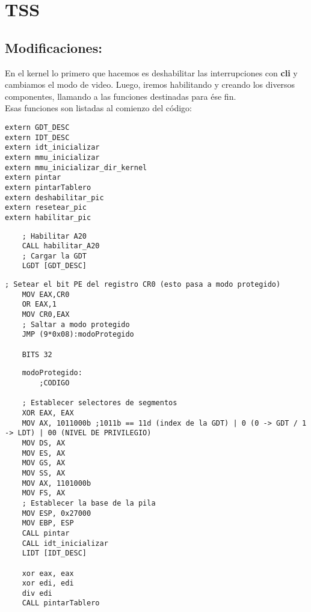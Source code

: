
\section{TSS}
\subsection{Modificaciones:}

En el kernel lo primero que hacemos es deshabilitar las interrupciones con \textbf{cli} y cambiamos el modo de video. 
Luego, iremos habilitando y creando los diversos componentes, llamando a las funciones destinadas para \'ese fin.
\\
Esas funciones son listadas al comienzo del c\'odigo:

\begin{codesnippet}
\begin{verbatim}
extern GDT_DESC
extern IDT_DESC 
extern idt_inicializar
extern mmu_inicializar
extern mmu_inicializar_dir_kernel
extern pintar
extern pintarTablero
extern deshabilitar_pic
extern resetear_pic
extern habilitar_pic
\end{verbatim}
\end{codesnippet}

\begin{codesnippet}
\begin{verbatim}
    ; Habilitar A20
    CALL habilitar_A20
    ; Cargar la GDT
    LGDT [GDT_DESC]
\end{verbatim}
\end{codesnippet}

\begin{codesnippet}
\begin{verbatim}
; Setear el bit PE del registro CR0 (esto pasa a modo protegido)
    MOV EAX,CR0
    OR EAX,1
    MOV CR0,EAX
    ; Saltar a modo protegido
    JMP (9*0x08):modoProtegido

    BITS 32
\end{verbatim}
\end{codesnippet}

\begin{codesnippet}
\begin{verbatim}
    modoProtegido:
        ;CODIGO
        
    ; Establecer selectores de segmentos
    XOR EAX, EAX
    MOV AX, 1011000b ;1011b == 11d (index de la GDT) | 0 (0 -> GDT / 1 -> LDT) | 00 (NIVEL DE PRIVILEGIO)
    MOV DS, AX
    MOV ES, AX
    MOV GS, AX
    MOV SS, AX
    MOV AX, 1101000b
    MOV FS, AX
    ; Establecer la base de la pila
    MOV ESP, 0x27000
    MOV EBP, ESP
    CALL pintar
    CALL idt_inicializar
	LIDT [IDT_DESC]

    xor eax, eax
    xor edi, edi
    div edi	
	CALL pintarTablero
\end{verbatim}
\end{codesnippet}

